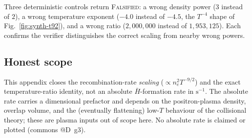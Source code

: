 Three deterministic controls return \textsc{Falsified}: a wrong density power
($3$ instead of $2$), a wrong temperature exponent ($-4.0$ instead of
$-4.5$, the $T^{-4}$ shape of Fig.~\ref{fig:synth-t92}), and a wrong ratio
($2{,}000{,}000$ instead of $1{,}953{,}125$). Each confirms the verifier
distinguishes the correct scaling from nearby wrong powers.

\subsection{Honest scope}
\label{app:synth-scope}

This appendix closes the recombination-rate \emph{scaling}
($\propto n_e^2 T^{-9/2}$) and the exact temperature-ratio identity, not an
absolute $\bar H$-formation rate in $\mathrm{s}^{-1}$. The absolute rate
carries a dimensional prefactor and depends on the positron-plasma density,
overlap volume, and the (eventually flattening) low-$T$ behaviour of the
collisional theory; these are plasma inputs out of scope here. No absolute
rate is claimed or plotted (commons @D~g3).
